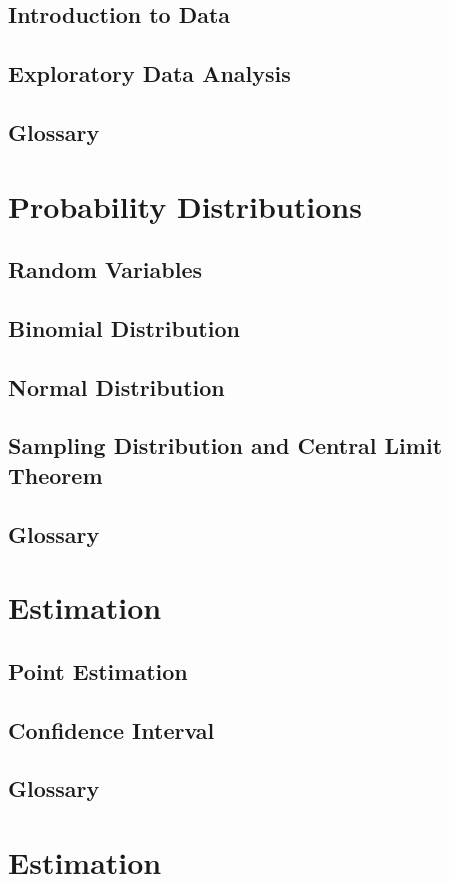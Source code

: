 \section{Introduction to Data}
\section{Exploratory Data Analysis}
 \section*{Glossary} 


\chapter{Probability Distributions}
\section{Random Variables}
\section{ Binomial Distribution}
\section{Normal Distribution}
\section{Sampling Distribution and Central Limit Theorem}
\section*{Glossary} 


\chapter{Estimation}
\section{Point Estimation}
\section{Confidence Interval}
\section*{Glossary} 

\chapter{Estimation}
